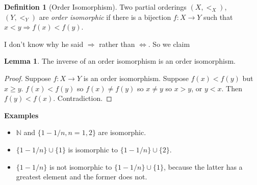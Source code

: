 \documentclass{article}
\theoremstyle{definition}
\newtheorem{definition}{Definition}
\newtheorem{lemma}{Lemma}
\numberwithin{definition}{section}
\begin{document}
\begin{definition}[Order Isomorphism]
Two partial orderings $(X,<_{X})$, $(Y,<_{Y})$ are \textit{order isomorphic} if there is a bijection $f: X \to Y$ such that $x <y \Rightarrow f(x) < f(y)$. 
\end{definition}
I don't know why he said $\Rightarrow$ rather than $\iff$. So we claim
\begin{lemma}
The inverse of an order isomorphism is an order isomorphism.
\end{lemma}
\begin{proof}
Suppose $f:X \to Y$ is an order isomorphism. Suppose $f(x)<f(y)$ but $x \ge y$. $f(x) < f(y)$ so $f(x) \ne f(y)$ so $x \ne y$ so $x>y$, or $y<x$. Then $f(y)<f(x)$. Contradiction.
\end{proof}

\textbf{Examples}
\begin{itemize}
\item $\mathbb{N}$ and $\{1-1/n,n = 1,2\}$ are isomorphic.
\item $\{1-1/n\}\cup \{1\}$ is isomorphic to $\{1-1/n\}\cup \{2\}$.
\item $\{1-1/n\}$ is not isomorphic to $\{1-1/n\} \cup \{1\}$, because the latter has a greatest element and the former does not.
\end{itemize}
\end{document}
